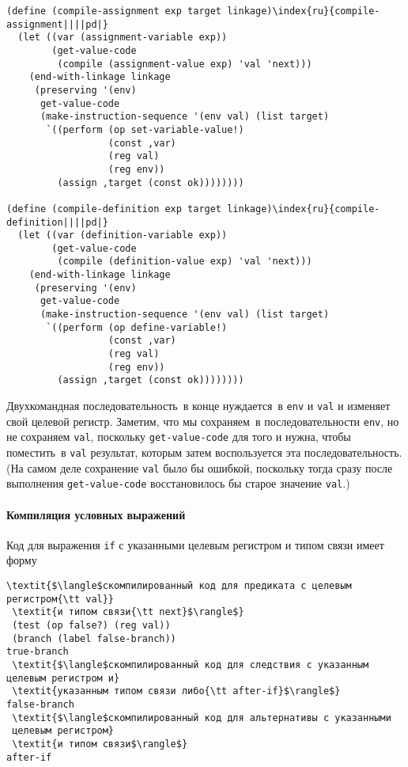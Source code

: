 \begin{Verbatim}[fontsize=\small]
(define (compile-assignment exp target linkage)\index{ru}{compile-assignment||||pd|}
  (let ((var (assignment-variable exp))
        (get-value-code
         (compile (assignment-value exp) 'val 'next)))
    (end-with-linkage linkage
     (preserving '(env)
      get-value-code
      (make-instruction-sequence '(env val) (list target)
       `((perform (op set-variable-value!)
                  (const ,var)
                  (reg val)
                  (reg env))
         (assign ,target (const ok))))))))

(define (compile-definition exp target linkage)\index{ru}{compile-definition||||pd|}
  (let ((var (definition-variable exp))
        (get-value-code
         (compile (definition-value exp) 'val 'next)))
    (end-with-linkage linkage
     (preserving '(env)
      get-value-code
      (make-instruction-sequence '(env val) (list target)
       `((perform (op define-variable!)
                  (const ,var)
                  (reg val)
                  (reg env))
         (assign ,target (const ok))))))))
\end{Verbatim}
Двухкомандная последовательность~в конце нуждается~в {\tt env}
и {\tt val} и изменяет свой целевой регистр.  Заметим, что
мы сохраняем~в последовательности {\tt env},  но не
сохраняем {\tt val}, поскольку {\tt get-value-code} для
того и нужна, чтобы поместить~в {\tt val} результат, которым
затем воспользуется эта последовательность.  (На самом деле
сохранение {\tt val} было бы ошибкой, поскольку
тогда сразу после выполнения {\tt get-value-code}
восстановилось бы старое значение {\tt val}.)

\paragraph{Компиляция условных выражений}


Код для выражения {\tt if} с указанными целевым
регистром и типом связи имеет форму

\begin{Verbatim}[fontsize=\small]
 \textit{$\langle$скомпилированный код для предиката с целевым регистром{\tt val}} 
 \textit{и типом связи{\tt next}$\rangle$}
 (test (op false?) (reg val))
 (branch (label false-branch))
true-branch
 \textit{$\langle$скомпилированный код для следствия с указанным целевым регистром и} 
 \textit{указанным типом связи либо{\tt after-if}$\rangle$}
false-branch
 \textit{$\langle$скомпилированный код для альтернативы с указанными
 целевым регистром}
 \textit{и типом связи$\rangle$}
after-if
\end{Verbatim}

